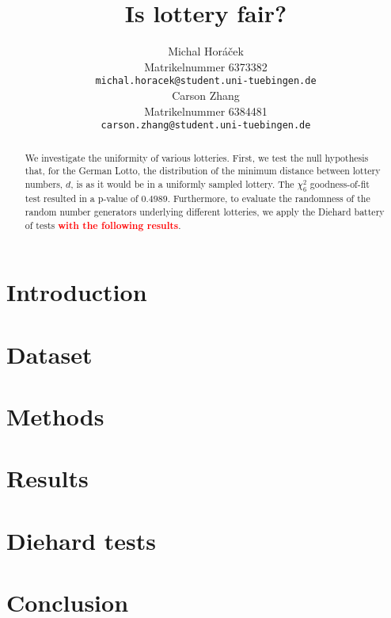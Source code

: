 \documentclass{article}
\title{Is lottery fair?}
\author{%
  Michal Horáček\\
  Matrikelnummer 6373382\\
  \texttt{michal.horacek@student.uni-tuebingen.de} \\
  \And
  Carson Zhang\\
  Matrikelnummer 6384481\\
  \texttt{carson.zhang@student.uni-tuebingen.de} \\
}
\newcommand{\todo}[1]{\textcolor{red}{\textbf{#1}}}
\begin{document}
\maketitle

\begin{abstract}
    We investigate the uniformity of various lotteries. 
    First, we test the null hypothesis that, for the German Lotto, the distribution of the minimum distance between
    lottery numbers, $d$, is as it would be in a uniformly sampled lottery. The $\chi^2_6$ goodness-of-fit
    test resulted in a p-value of $0.4989$.
    Furthermore, to evaluate the randomness of the random number generators underlying different lotteries,
    we apply the Diehard battery of tests \todo{with the following results}.
\end{abstract}

\section{Introduction}
\label{sec:introduction}


\section{Dataset}
\label{sec:dataset}


\section{Methods}
\label{sec:methods}


\section{Results}
\label{sec:results}


\section{Diehard tests}
\label{sec:diehard}


\section{Conclusion}
\label{sec:conclusion}




\end{document}
